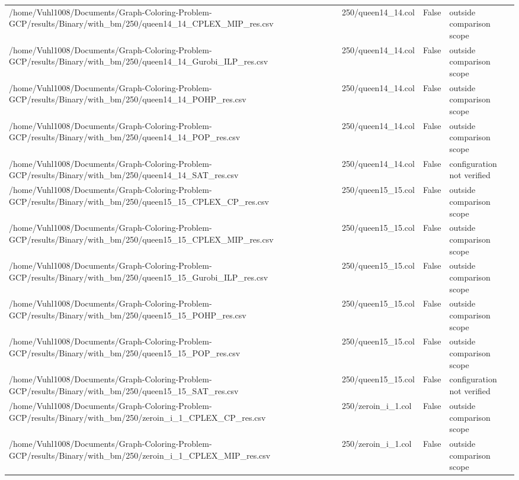 \begin{table}[htbp]
\begin{tabular}{llll}
/home/Vuhl1008/Documents/Graph-Coloring-Problem-GCP/results/Binary/with\_bm/250/queen14\_14\_CPLEX\_MIP\_res.csv & 250/queen14\_14.col & False & outside comparison scope \\
/home/Vuhl1008/Documents/Graph-Coloring-Problem-GCP/results/Binary/with\_bm/250/queen14\_14\_Gurobi\_ILP\_res.csv & 250/queen14\_14.col & False & outside comparison scope \\
/home/Vuhl1008/Documents/Graph-Coloring-Problem-GCP/results/Binary/with\_bm/250/queen14\_14\_POHP\_res.csv & 250/queen14\_14.col & False & outside comparison scope \\
/home/Vuhl1008/Documents/Graph-Coloring-Problem-GCP/results/Binary/with\_bm/250/queen14\_14\_POP\_res.csv & 250/queen14\_14.col & False & outside comparison scope \\
/home/Vuhl1008/Documents/Graph-Coloring-Problem-GCP/results/Binary/with\_bm/250/queen14\_14\_SAT\_res.csv & 250/queen14\_14.col & False & configuration not verified \\
/home/Vuhl1008/Documents/Graph-Coloring-Problem-GCP/results/Binary/with\_bm/250/queen15\_15\_CPLEX\_CP\_res.csv & 250/queen15\_15.col & False & outside comparison scope \\
/home/Vuhl1008/Documents/Graph-Coloring-Problem-GCP/results/Binary/with\_bm/250/queen15\_15\_CPLEX\_MIP\_res.csv & 250/queen15\_15.col & False & outside comparison scope \\
/home/Vuhl1008/Documents/Graph-Coloring-Problem-GCP/results/Binary/with\_bm/250/queen15\_15\_Gurobi\_ILP\_res.csv & 250/queen15\_15.col & False & outside comparison scope \\
/home/Vuhl1008/Documents/Graph-Coloring-Problem-GCP/results/Binary/with\_bm/250/queen15\_15\_POHP\_res.csv & 250/queen15\_15.col & False & outside comparison scope \\
/home/Vuhl1008/Documents/Graph-Coloring-Problem-GCP/results/Binary/with\_bm/250/queen15\_15\_POP\_res.csv & 250/queen15\_15.col & False & outside comparison scope \\
/home/Vuhl1008/Documents/Graph-Coloring-Problem-GCP/results/Binary/with\_bm/250/queen15\_15\_SAT\_res.csv & 250/queen15\_15.col & False & configuration not verified \\
/home/Vuhl1008/Documents/Graph-Coloring-Problem-GCP/results/Binary/with\_bm/250/zeroin\_i\_1\_CPLEX\_CP\_res.csv & 250/zeroin\_i\_1.col & False & outside comparison scope \\
/home/Vuhl1008/Documents/Graph-Coloring-Problem-GCP/results/Binary/with\_bm/250/zeroin\_i\_1\_CPLEX\_MIP\_res.csv & 250/zeroin\_i\_1.col & False & outside comparison scope \\

\end{tabular}
\end{table}
